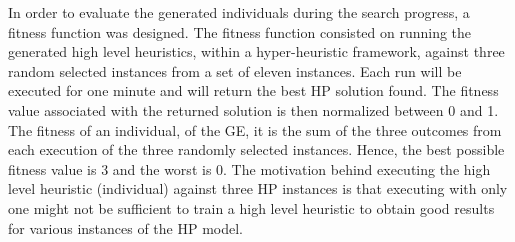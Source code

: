 \documentclass[conference]{IEEEtran}
\begin{document}
In order to evaluate the generated individuals during the search progress, a fitness function was designed. The fitness function consisted on running the generated high level heuristics, within a hyper-heuristic framework, against three random selected instances from a set of eleven instances. Each run will be executed for one minute and will return the best HP solution found. The fitness value associated with the returned solution is then normalized between 0 and 1. The fitness of an individual, of the GE, it is the sum of the three outcomes from each execution of the three randomly selected instances. Hence, the best possible fitness value is 3 and the worst is 0.
 The motivation behind executing the high level heuristic (individual) against three HP instances is that executing with only one might not be sufficient to train a high level heuristic to obtain good results for various instances of the HP model.
\end{document}
